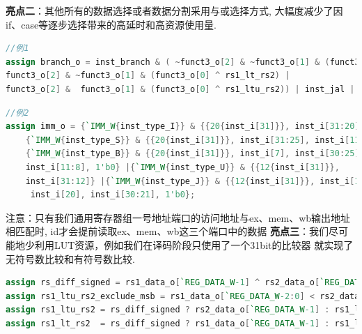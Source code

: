 \documentclass[lang=cn,11pt,a4paper,chinesefont=founder]{elegantpaper}
\begin{document}
\textbf{亮点二}：其他所有的数据选择或者数据分割采用与或选择方式, 大幅度减少了因if、case等逐步选择带来的高延时和高资源使用量. 
\begin{lstlisting}[language=verilog]
//例1
assign branch_o = inst_branch & ( ~funct3_o[2] & ~funct3_o[1] & (funct3_o[0] ^ rs1_eq_rs2) |
funct3_o[2] & ~funct3_o[1] & (funct3_o[0] ^ rs1_lt_rs2) |
funct3_o[2] &  funct3_o[1] & (funct3_o[0] ^ rs1_ltu_rs2)) | inst_jal | inst_jalr;
\end{lstlisting}
\begin{lstlisting}[language=verilog]
//例2
assign imm_o = {`IMM_W{inst_type_I}} & {{20{inst_i[31]}}, inst_i[31:20]} |
	{`IMM_W{inst_type_S}} & {{20{inst_i[31]}}, inst_i[31:25], inst_i[11:7]} |
	{`IMM_W{inst_type_B}} & {{20{inst_i[31]}}, inst_i[7], inst_i[30:25], 
	inst_i[11:8], 1'b0} |{`IMM_W{inst_type_U}} & {{12{inst_i[31]}}, 
	inst_i[31:12]} |{`IMM_W{inst_type_J}} & {{12{inst_i[31]}}, inst_i[19:12],
	 inst_i[20], inst_i[30:21], 1'b0};
\end{lstlisting}
注意：只有我们通用寄存器组一号地址端口的访问地址与ex、mem、wb输出地址相匹配时, id才会提前读取ex、mem、wb这三个端口中的数据
\textbf{亮点三}：我们尽可能地少利用LUT资源，例如我们在译码阶段只使用了一个31bit的比较器
就实现了无符号数比较和有符号数比较.

\begin{lstlisting}[language=verilog]
assign rs_diff_signed = rs1_data_o[`REG_DATA_W-1] ^ rs2_data_o[`REG_DATA_W-1];
assign rs1_ltu_rs2_exclude_msb = rs1_data_o[`REG_DATA_W-2:0] < rs2_data_o[`REG_DATA_W-2:0];
assign rs1_ltu_rs2 = rs_diff_signed ? rs2_data_o[`REG_DATA_W-1] : rs1_ltu_rs2_exclude_msb;
assign rs1_lt_rs2  = rs_diff_signed ? rs1_data_o[`REG_DATA_W-1] : rs1_ltu_rs2_exclude_msb;
\end{lstlisting}
\end{document}
